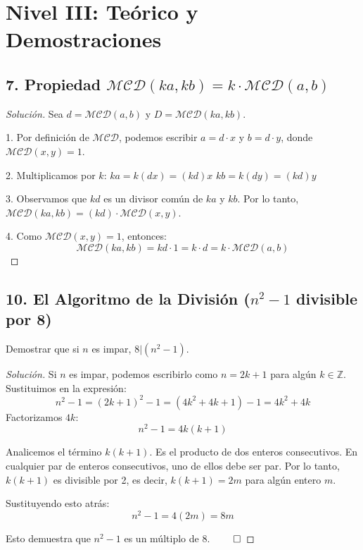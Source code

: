 \documentclass[12pt, letterpaper]{article}
\newenvironment{solucion}
    {\begin{proof}[Solución]}
    {\end{proof}}
\begin{document}
\section*{Nivel III: Teórico y Demostraciones}

\subsection*{7. Propiedad $\mathcal{MCD}(ka, kb) = k \cdot \mathcal{MCD}(a, b)$}

\begin{solucion}
    Sea $d = \mathcal{MCD}(a, b)$ y $D = \mathcal{MCD}(ka, kb)$.
    
    1. Por definición de $\mathcal{MCD}$, podemos escribir $a = d \cdot x$ y $b = d \cdot y$, donde $\mathcal{MCD}(x, y) = 1$.
    
    2. Multiplicamos por $k$:
    $ka = k(dx) = (kd)x$
    $kb = k(dy) = (kd)y$
    
    3. Observamos que $kd$ es un divisor común de $ka$ y $kb$.
    Por lo tanto, $\mathcal{MCD}(ka, kb) = (kd) \cdot \mathcal{MCD}(x, y)$.
    
    4. Como $\mathcal{MCD}(x, y) = 1$, entonces:
    \[ \mathcal{MCD}(ka, kb) = kd \cdot 1 = k \cdot d = k \cdot \mathcal{MCD}(a, b) \]
\end{solucion}

\subsection*{10. El Algoritmo de la División ($n^2-1$ divisible por 8)}
Demostrar que si $n$ es impar, $8 | (n^2 - 1)$.

\begin{solucion}
    Si $n$ es impar, podemos escribirlo como $n = 2k + 1$ para algún $k \in \mathbb{Z}$.
    Sustituimos en la expresión:
    \[ n^2 - 1 = (2k+1)^2 - 1 = (4k^2 + 4k + 1) - 1 = 4k^2 + 4k \]
    Factorizamos $4k$:
    \[ n^2 - 1 = 4k(k+1) \]
    
    Analicemos el término $k(k+1)$. Es el producto de dos enteros consecutivos.
    En cualquier par de enteros consecutivos, uno de ellos debe ser par.
    Por lo tanto, $k(k+1)$ es divisible por 2, es decir, $k(k+1) = 2m$ para algún entero $m$.
    
    Sustituyendo esto atrás:
    \[ n^2 - 1 = 4(2m) = 8m \]
    
    Esto demuestra que $n^2 - 1$ es un múltiplo de 8. $\qed$
\end{solucion}
\end{document}
